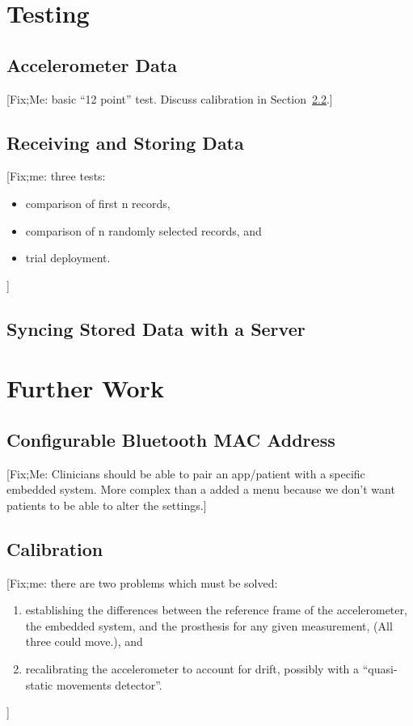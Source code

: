 \documentclass[11pt, a4paper, oneside, english]{scrbook}
\begin{document}
\chapter{Testing} %
\label{cha:testing}
\section{Accelerometer Data} %
\label{sec:accelerometer_data}
[Fix;Me: basic ``12 point'' test. Discuss calibration in Section~\ref{sec:calibration}.]
\section{Receiving and Storing Data} %
\label{sec:receiving_data}
[Fix;me: three tests:
\begin{itemize}
  \item comparison of first n records,
  \item comparison of n randomly selected records, and
  \item trial deployment.
\end{itemize}
]
\section{Syncing Stored Data with a Server} %
\label{sec:syncing_stored_data_with_a_server}

\chapter{Further Work} %
\label{cha:further_work}
\section{Configurable Bluetooth MAC Address} %
\label{sec:configurable_bluetooth_mac_adress}
[Fix;Me: Clinicians should be able to pair an app/patient with a specific embedded system. More complex than a added a menu because we don't want patients to be able to alter the settings.]
\section{Calibration} %
\label{sec:calibration}
[Fix;me: there are two problems which must be solved:
\begin{enumerate}
\item establishing the differences between the reference frame of the accelerometer, the embedded system, and the prosthesis for any given measurement, (All three could move.), and
\item recalibrating the accelerometer to account for drift, possibly with a ``quasi-static movements detector''.
\end{enumerate}]
\end{document}
